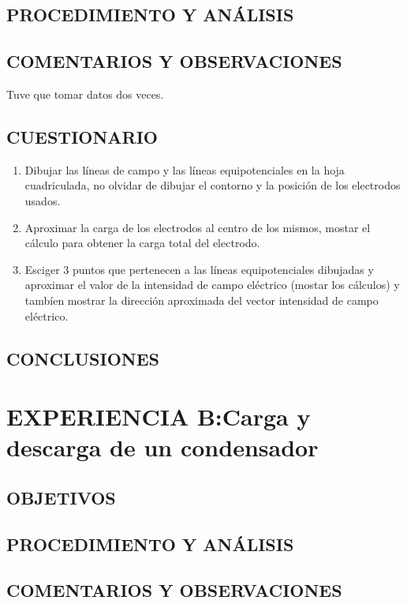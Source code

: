 \documentclass[10pt, twoside]{article}
\begin{document}
\subsection{PROCEDIMIENTO Y ANÁLISIS}%

\subsection{COMENTARIOS Y OBSERVACIONES}%

Tuve que tomar datos dos veces.

\subsection{CUESTIONARIO}%

\begin{enumerate}[label=\roman*]
	\item Dibujar las líneas de campo y las líneas equipotenciales en la hoja
		cuadriculada, no olvidar de dibujar el contorno y la posición de los
		electrodos usados.
	\item Aproximar la carga de los electrodos al centro de los mismos,
		mostar el cálculo para obtener la carga total del electrodo.
	\item Esciger $3$ puntos que pertenecen a las líneas equipotenciales
		dibujadas y aproximar el valor de la intensidad de campo
		eléctrico (mostar los cálculos) y tambíen mostrar la dirección
		aproximada del vector intensidad de campo eléctrico.
\end{enumerate}

\subsection{CONCLUSIONES}%


\section{EXPERIENCIA B:Carga y descarga de un condensador}%

\subsection{OBJETIVOS}%

\subsection{PROCEDIMIENTO Y ANÁLISIS}%

\subsection{COMENTARIOS Y OBSERVACIONES}%
\end{document}
